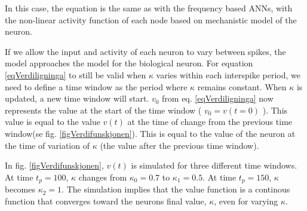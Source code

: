 In this case, the equation is the same as with the frequency based ANNs, with the non-linear activity function of each node based on mechanistic model of the neuron. %


If we allow the input and activity of each neuron to vary between spikes, the model approaches the model for the biological neuron.
For equation \eqref{eqVerdiligninga} to still be valid when $\kappa$ varies within each interspike period, we need to define a time window as the period where $\kappa$ remains constant. 
When $\kappa$ is updated, a new time window will start. 
$v_0$ from eq. \eqref{eqVerdiligninga} now represents the value at the start of the time window ( $v_0 = v(t=0)$ ). 
This value is equal to the value $v(t)$ at the time of change from the previous time window(se fig. \ref{figVerdifunskjonen}).
This is equal to the value of the neuron at the time of variation of $\kappa$ (the value after the previous time window).

In fig. \ref{figVerdifunskjonen}, $v(t)$ is simulated for three different time windows. At time $t_p=100$, $\kappa$ changes from $\kappa_0=0.7$ to $\kappa_1=0.5$. At time $t_p=150$, $\kappa$ becomes $\kappa_2=1$. 
The simulation implies that the value function is a continous function that converges toward the neurons final value, $\kappa$, even for varying $\kappa$.



